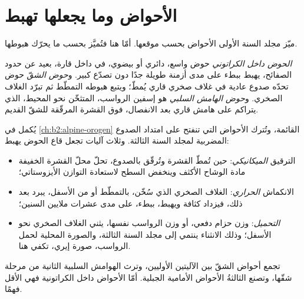 \section{الأحواض وما يجعلها تهبط}\label{sec:b2:basins-compared:types}

ميّز مجلد السنة الأولى الأحواض بحسب موقعها. أمّا هنا فتُميَّز بحسب ما يحرّك
هبوطها.

\begin{definition}\label{def:b2:basins-compared:types}
\emph{الحوض داخل الكراتوني} حوض واسع، دائري أو بيضوي، في
داخل قارة، بعيد عن حدود الصفائح، يهبط ببطء على مدى أزمنة طويلة جدًا
دون تصدّع كبير. و\emph{حوض الشقّ} حوض تحدّه صدوع عادية
في غلاف صخري قاري يُمطّ؛ ويتبع هبوطه التمطّط ثم
تبرّد الغلاف الصخري. و\emph{حوض الهامش السلبي} هو
إسفين الرواسب، المتثخّن نحو المحيط، الذي يتراكم على هامش قاري بعد
الانفصال، فوق القشرة المرقّقة للشقّ القديم.
\end{definition}

يُكمل  في \cref{ch:b2:alpine-orogen} القائمة، وتُترك الأحواض التي تنفتح
على امتداد الصدوع المضربية لمجلد السنة الثالثة. وثلاث آليات تجعل قاع
الحوض يهبط:
\begin{itemize}
  \item الترقيق \emph{الميكانيكي}: حين تُمطّ القشرة وتُرقّق بالصدوع، تحلّ محلّ
        القشرة الخفيفة مادة الوشاح الأكثف وينخفض السطح لاستعادة التوازن الأيزوستاتي؛
  \item الانكماش \emph{الحراري}: الغلاف الصخري الذي سُخّن، بالتمطّط أو من
        الأسفل، يبرد بعد ذلك، فيزداد كثافة ويهبط، ببطء، على مدى عشرات ملايين السنين؛
  \item \emph{التحميل}: وزن حزام دفعي، أو وزن الرواسب نفسها، يثني
        الغلاف الصخري نحو الأسفل؛ وذلك الانثناء ينتمي إلى مجلد السنة الثالثة، والصورة المحلية لحمل
        الرواسب، صورة إيري، تكفي هنا.
\end{itemize}
تجمع أحواض الشقّ بين الآليتين الأوليين، وترث الهوامش السلبية الثانية من مرحلة شقّها،
وتصنع الثالثةُ الأحواض الأمامية الجبلية. أمّا الأحواض داخل الكراتونية فهي الأقل فهمًا.

